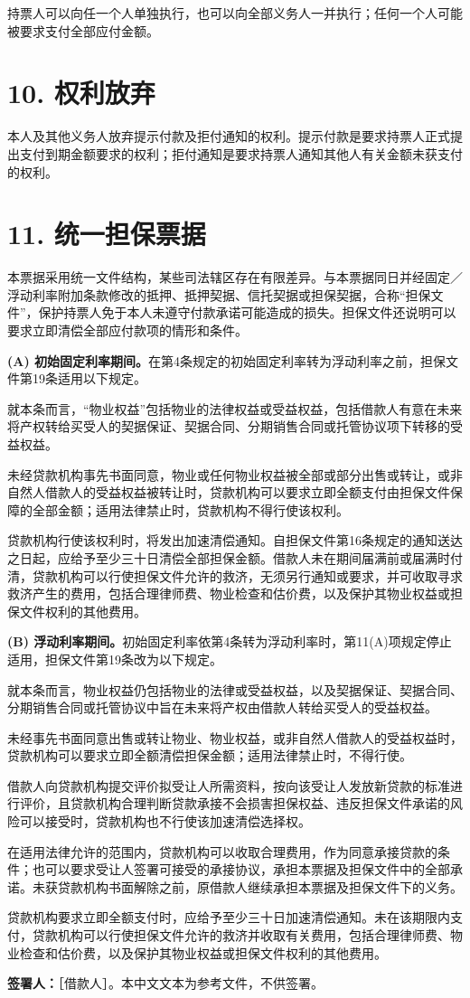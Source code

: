 \documentclass[UTF8,fontset=none,11pt,a4paper]{ctexart}
\begin{document}
持票人可以向任一个人单独执行，也可以向全部义务人一并执行；任何一个人可能被要求支付全部应付金额。


\section*{10. 权利放弃}
本人及其他义务人放弃提示付款及拒付通知的权利。提示付款是要求持票人正式提出支付到期金额要求的权利；拒付通知是要求持票人通知其他人有关金额未获支付的权利。


\section*{11. 统一担保票据}
本票据采用统一文件结构，某些司法辖区存在有限差异。与本票据同日并经固定／浮动利率附加条款修改的抵押、抵押契据、信托契据或担保契据，合称“担保文件”，保护持票人免于本人未遵守付款承诺可能造成的损失。担保文件还说明可以要求立即清偿全部应付款项的情形和条件。


\textbf{(A) 初始固定利率期间。}在第4条规定的初始固定利率转为浮动利率之前，担保文件第19条适用以下规定。


就本条而言，“物业权益”包括物业的法律权益或受益权益，包括借款人有意在未来将产权转给买受人的契据保证、契据合同、分期销售合同或托管协议项下转移的受益权益。


未经贷款机构事先书面同意，物业或任何物业权益被全部或部分出售或转让，或非自然人借款人的受益权益被转让时，贷款机构可以要求立即全额支付由担保文件保障的全部金额；适用法律禁止时，贷款机构不得行使该权利。


贷款机构行使该权利时，将发出加速清偿通知。自担保文件第16条规定的通知送达之日起，应给予至少三十日清偿全部担保金额。借款人未在期间届满前或届满时付清，贷款机构可以行使担保文件允许的救济，无须另行通知或要求，并可收取寻求救济产生的费用，包括合理律师费、物业检查和估价费，以及保护其物业权益或担保文件权利的其他费用。


\textbf{(B) 浮动利率期间。}初始固定利率依第4条转为浮动利率时，第11(A)项规定停止适用，担保文件第19条改为以下规定。


就本条而言，物业权益仍包括物业的法律或受益权益，以及契据保证、契据合同、分期销售合同或托管协议中旨在未来将产权由借款人转给买受人的受益权益。


未经事先书面同意出售或转让物业、物业权益，或非自然人借款人的受益权益时，贷款机构可以要求立即全额清偿担保金额；适用法律禁止时，不得行使。


借款人向贷款机构提交评价拟受让人所需资料，按向该受让人发放新贷款的标准进行评价，且贷款机构合理判断贷款承接不会损害担保权益、违反担保文件承诺的风险可以接受时，贷款机构也不行使该加速清偿选择权。


在适用法律允许的范围内，贷款机构可以收取合理费用，作为同意承接贷款的条件；也可以要求受让人签署可接受的承接协议，承担本票据及担保文件中的全部承诺。未获贷款机构书面解除之前，原借款人继续承担本票据及担保文件下的义务。


贷款机构要求立即全额支付时，应给予至少三十日加速清偿通知。未在该期限内支付，贷款机构可以行使担保文件允许的救济并收取有关费用，包括合理律师费、物业检查和估价费，以及保护其物业权益或担保文件权利的其他费用。


\textbf{签署人：}［借款人］。本中文文本为参考文件，不供签署。
\end{document}
